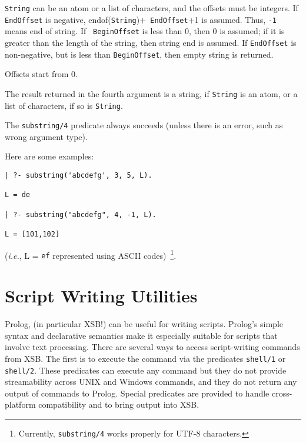 \begin{description}


{\tt String} can be an atom or a list of characters, and the offsets must
be integers.  If {\tt EndOffset} is negative, endof({\tt String})+{\tt
  EndOffset}+1 is assumed. Thus, {\tt -1} means end of string.  If {\tt
  BeginOffset} is less than 0, then 0 is assumed; if it is greater than the
length of the string, then string end is assumed. If {\tt EndOffset} is
non-negative, but is less than {\tt BeginOffset}, then empty string is
returned.

Offsets start from 0.

The result returned in the fourth argument is a string, if {\tt String} is
an atom, or a list of characters, if so is {\tt String}.

The \verb|substring/4| predicate always succeeds (unless there is an error,
such as wrong argument type).

Here are some examples: 
\begin{verbatim}
| ?- substring('abcdefg', 3, 5, L).

L = de

| ?- substring("abcdefg", 4, -1, L).

L = [101,102]
\end{verbatim}
({\it i.e.}, L = {\tt ef} represented using ASCII
codes)~\footnote{Currently, {\tt substring/4} works properly for UTF-8
  characters.}.

\end{description}

\section{Script Writing Utilities}

Prolog, (in particular XSB!) can be useful for writing scripts.
Prolog's simple syntax and declarative semantics make it especially
suitable for scripts that involve text processing.  There are several
ways to access script-writing commands from XSB.  The first is to
execute the command via the predicates {\tt shell/1} or {\tt shell/2}.
These predicates can execute any command but they do not provide
streamability across UNIX and Windows commands, and they do not return
any output of commands to Prolog.  Special predicates are provided to
handle cross-platform compatibility and to bring output into XSB.

